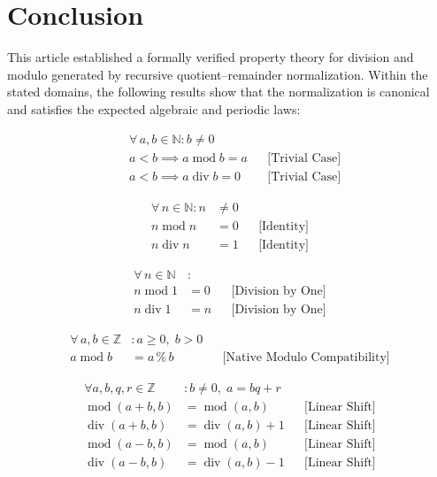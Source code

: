 \section{Conclusion}
\label{sec:conclusion}

This article established a formally verified property theory for division
and modulo generated by recursive quotient--remainder normalization. Within
the stated domains, the following results show that the normalization is
canonical and satisfies the expected algebraic and periodic laws:

\begin{equation*}
\begin{aligned}
& \forall\, a, b \in \mathbb{N} : b \neq 0 \\
& a < b \implies a \operatorname{mod} b = a &&\text{[Trivial Case]} \\
& a < b \implies a \operatorname{div} b = 0 &&\text{[Trivial Case]}
\end{aligned}
\end{equation*}

\begin{equation*}
\begin{aligned}
\forall\, n \in \mathbb{N} : n &\neq 0 \\
n \operatorname{mod} n &= 0 &&\text{[Identity]} \\
n \operatorname{div} n &= 1 &&\text{[Identity]}
\end{aligned}
\end{equation*}

\begin{equation*}
\begin{aligned}
\forall\, n \in \mathbb{N} &: \\
n \operatorname{mod} 1 &= 0 &&\text{[Division by One]} \\
n \operatorname{div} 1 &= n &&\text{[Division by One]}
\end{aligned}
\end{equation*}

\begin{equation*}
\begin{aligned}
\forall\, a, b \in \mathbb{Z} &: a \geq 0,\; b > 0 \\
a \operatorname{mod} b &= a \mathbin{\%}
  b &&\text{[Native Modulo Compatibility]}
\end{aligned}
\end{equation*}

\begin{equation*}
\begin{aligned}
\forall a,b,q,r \in \mathbb{Z} &: b \neq 0,\; a = bq + r \\
\operatorname{mod}(a + b, b) &= \operatorname{mod}(a, b) &&\text{[Linear Shift]} \\
\operatorname{div}(a + b, b) &= \operatorname{div}(a, b) + 1 &&\text{[Linear Shift]} \\
\operatorname{mod}(a - b, b) &= \operatorname{mod}(a, b) &&\text{[Linear Shift]} \\
\operatorname{div}(a - b, b) &= \operatorname{div}(a, b) - 1 &&\text{[Linear Shift]}
\end{aligned}
\end{equation*}

